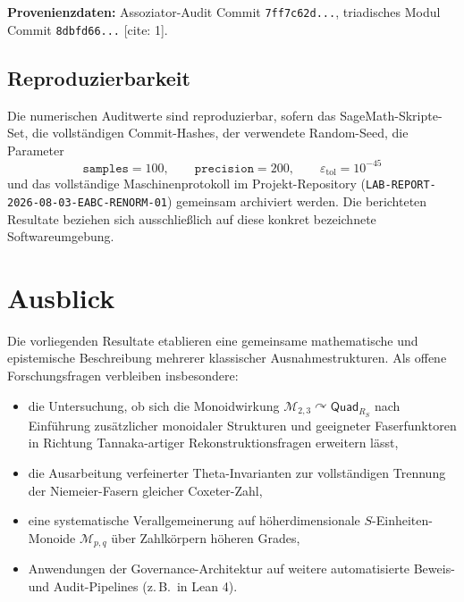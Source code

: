 \documentclass[11pt,a4paper]{article}
\begin{document}
	\noindent \textbf{Provenienzdaten:} Assoziator-Audit Commit \texttt{7ff7c62d...}, triadisches Modul Commit \texttt{8dbfd66...} \cite{eabcAudit}[cite: 1].
	
	\subsection*{Reproduzierbarkeit}
	Die numerischen Auditwerte sind reproduzierbar, sofern das SageMath-Skripte-Set, die vollständigen Commit-Hashes, der verwendete Random-Seed, die Parameter
	\begin{equation}
		\texttt{samples}=100, \qquad \texttt{precision}=200, \qquad \varepsilon_{\mathrm{tol}}=10^{-45}
	\end{equation}
	und das vollständige Maschinenprotokoll im Projekt-Repository (\texttt{LAB-REPORT-2026-08-03-EABC-RENORM-01}) gemeinsam archiviert werden. Die berichteten Resultate beziehen sich ausschließlich auf diese konkret bezeichnete Softwareumgebung.
	
	\section{Ausblick}
	
	Die vorliegenden Resultate etablieren eine gemeinsame mathematische und epistemische Beschreibung mehrerer klassischer Ausnahmestrukturen. Als offene Forschungsfragen verbleiben insbesondere:
	\begin{itemize}
		\item die Untersuchung, ob sich die Monoidwirkung $\mathcal{M}_{2,3} \curvearrowright \mathsf{Quad}_{R_S}$ nach Einführung zusätzlicher monoidaler Strukturen und geeigneter Faserfunktoren in Richtung Tannaka-artiger Rekonstruktionsfragen erweitern lässt,
		\item die Ausarbeitung verfeinerter Theta-Invarianten zur vollständigen Trennung der Niemeier-Fasern gleicher Coxeter-Zahl,
		\item eine systematische Verallgemeinerung auf höherdimensionale $S$-Einheiten-Monoide $\mathcal{M}_{p,q}$ über Zahlkörpern höheren Grades,
		\item Anwendungen der Governance-Architektur auf weitere automatisierte Beweis- und Audit-Pipelines (z.\,B.\ in Lean 4).
	\end{itemize}
	
\end{document}
